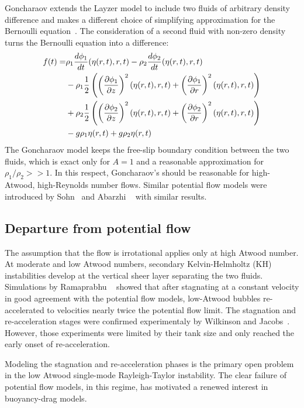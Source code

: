 Goncharaov extends the Layzer model to include two fluids of arbitrary density difference and makes a different choice of simplifying approximation for the Bernoulli equation~\cite{Goncharaov2002}.
The consideration of a second fluid with non-zero density turns the Bernoulli equation  into a difference:
\begin{equation} \label{eqn:GonBernoulli}
\begin{aligned}
f(t) = &   \rho_1 \frac{d \phi_1}{d t}(\eta(r,t), r, t) - \rho_2 \frac{d \phi_2}{d t}(\eta(r,t), r, t) \\
& - \rho_1 \frac{1}{2} \left(\left(\frac{\partial \phi_1}{\partial z}\right)^2(\eta(r,t), r, t) +\left(\frac{\partial \phi_1}{\partial r}\right)^2(\eta(r,t), r, t)\right) \\
& + \rho_2 \frac{1}{2} \left(\left(\frac{\partial \phi_2}{\partial z}\right)^2(\eta(r,t), r, t) +\left(\frac{\partial \phi_2}{\partial r}\right)^2(\eta(r,t), r, t)\right) \\
& - g \rho_1 \eta(r,t) + g \rho_2 \eta(r,t) 
\end{aligned}
\end{equation}
The Goncharaov model keeps the free-slip boundary condition between the two fluids, which is exact only for $A = 1$ and a reasonable approximation for $\rho_1 / \rho_2 >> 1$.
In this respect, Goncharaov's should be reasonable for high-Atwood, high-Reynolds number flows.
Similar potential flow models were introduced by Sohn~\cite{Sohn2003} and Abarzhi \etal~\cite{Abarzhi2003} with similar results.

\subsection{Departure from potential flow}
The assumption that the flow is irrotational applies only at high Atwood number.
At moderate and low Atwood numbers, secondary Kelvin-Helmholtz (KH) instabilities develop at the vertical sheer layer separating the two fluids.
Simulations by Ramaprabhu \etal ~\cite{Ramaprabhu2006} showed that after stagnating at a constant velocity in good agreement with the potential flow models, low-Atwood bubbles re-accelerated to velocities nearly twice the potential flow limit.
The stagnation and re-acceleration stages were confirmed experimentaly by Wilkinson and Jacobs~\cite{Wilkinson2007}.
However, those experiments were limited by their tank size and only reached the early onset of re-acceleration.

Modeling the stagnation and re-acceleration phases is the primary open problem in the low Atwood single-mode Rayleigh-Taylor instability.
The clear failure of potential flow models, in this regime, has motivated a renewed interest in buoyancy-drag models.

